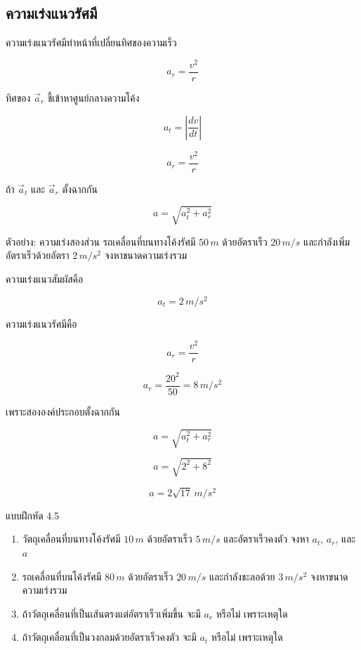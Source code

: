 \subsection{ความเร่งแนวรัศมี}

ความเร่งแนวรัศมีทำหน้าที่เปลี่ยนทิศของความเร็ว

\[
a_r=\frac{v^2}{r}
\]

ทิศของ $\vec{a}_r$ ชี้เข้าหาศูนย์กลางความโค้ง

\begin{tcolorbox}[title=ความเร่งในการเคลื่อนที่ตามเส้นโค้ง]
\[
a_t=\left|\frac{dv}{dt}\right|
\]

\[
a_r=\frac{v^2}{r}
\]

ถ้า $\vec{a}_t$ และ $\vec{a}_r$ ตั้งฉากกัน

\[
a=\sqrt{a_t^2+a_r^2}
\]
\end{tcolorbox}

\begin{examplebox}{ตัวอย่าง: ความเร่งสองส่วน}
รถเคลื่อนที่บนทางโค้งรัศมี $50\,\si{m}$ ด้วยอัตราเร็ว $20\,\si{m/s}$ และกำลังเพิ่มอัตราเร็วด้วยอัตรา $2\,\si{m/s^2}$ จงหาขนาดความเร่งรวม

ความเร่งแนวสัมผัสคือ

\[
a_t=2\,\si{m/s^2}
\]

ความเร่งแนวรัศมีคือ

\[
a_r=\frac{v^2}{r}
\]

\[
a_r=\frac{20^2}{50}=8\,\si{m/s^2}
\]

เพราะสององค์ประกอบตั้งฉากกัน

\[
a=\sqrt{a_t^2+a_r^2}
\]

\[
a=\sqrt{2^2+8^2}
\]

\[
a=2\sqrt{17}\,\si{m/s^2}
\]
\end{examplebox}

\begin{exercisebox}{แบบฝึกหัด 4.5}
\begin{enumerate}
    \item วัตถุเคลื่อนที่บนทางโค้งรัศมี $10\,\si{m}$ ด้วยอัตราเร็ว $5\,\si{m/s}$ และอัตราเร็วคงตัว จงหา $a_t$, $a_r$, และ $a$
    \item รถเคลื่อนที่บนโค้งรัศมี $80\,\si{m}$ ด้วยอัตราเร็ว $20\,\si{m/s}$ และกำลังชะลอด้วย $3\,\si{m/s^2}$ จงหาขนาดความเร่งรวม
    \item ถ้าวัตถุเคลื่อนที่เป็นเส้นตรงแต่อัตราเร็วเพิ่มขึ้น จะมี $a_r$ หรือไม่ เพราะเหตุใด
    \item ถ้าวัตถุเคลื่อนที่เป็นวงกลมด้วยอัตราเร็วคงตัว จะมี $a_t$ หรือไม่ เพราะเหตุใด
\end{enumerate}
\end{exercisebox}

